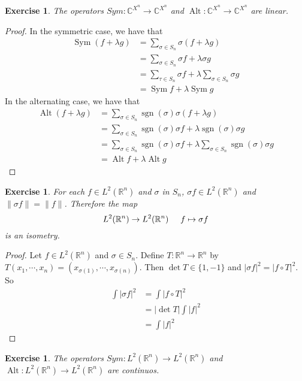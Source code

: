 \documentclass[12pt]{amsart}
\newtheorem{ex}[thm]{Exercise}
\newcommand{\lam}{\lambda}
\newcommand{\sig}{\sigma}
\newcommand{\C}{\mathbb{C}}
\newcommand{\R}{\mathbb{R}}
\DeclareMathOperator{\alt}{Alt}
\DeclareMathOperator{\sym}{Sym}
\DeclareMathOperator{\sgn}{sgn}
\begin{document}
\begin{ex}
	The operators $Sym: \C^{X^n} \rightarrow \C^{X^n}$ and $\alt: \C^{X^n} \rightarrow \C^{X^n}$ are linear.
\end{ex}

\begin{proof} 
	In the symmetric case, we have that
	\begin{align*}
		\sym(f+ \lam g) 
		&= \sum_{\sig \in S_n}  \sig (f+ \lam g) \\
		&= \sum_{\sig \in S_n}  \sig f + \lam \sig g \\
		&= \sum_{\tau \in S_n}  \sig f + \lam \sum_{\sig \in S_n}  \sig g \\
		&= \sym f + \lam \sym g
	\end{align*}
	In the alternating case, we have that
	\begin{align*}
		\alt(f+ \lam g) 
		&= \sum_{\sig \in S_n}  \sgn(\sig) \sig (f+ \lam g) \\
		&= \sum_{\sig \in S_n}  \sgn(\sig) \sig f + \lam \sgn(\sig) \sig g \\
		&= \sum_{\sig \in S_n}  \sgn(\sig) \sig f + \lam  \sum_{\sig \in S_n}  \sgn(\sig) \sig g \\
		&= \alt f + \lam \alt g
	\end{align*}
\end{proof}

\begin{ex}
	For each $f \in L^2(\R^n)$ and $\sig$ in $S_n$, $\sig f \in L^2(\R^n)$ and $\| \sig f \| = \| f \|$. Therefore the map $$L^2(\R^n) \rightarrow L^2(\R^n) \hspace{.5cm} f \mapsto \sig f$$ is an isometry.
\end{ex}

\begin{proof}
	Let $f \in L^2(\R^n)$ and $\sig \in S_n$. Define $T: \R^n \rightarrow \R^n$ by $T(x_1, \cdots, x_n) = (x_{\sig(1)}, \cdots, x_{\sig(n)})$. Then $\det T \in \{1, -1\}$ and $ |\sig f|^2 = |f \circ T|^2$. So 
	\begin{align*}
		\int |\sig f|^2 
		&= \int |f \circ T|^2 \\
		&= |\det T| \int |f|^2 \\
		&=  \int |f|^2
	\end{align*}
\end{proof}

\begin{ex}
	The operators $Sym: L^2(\R^n) \rightarrow L^2(\R^n)$ and $\alt: L^2(\R^n) \rightarrow L^2(\R^n)$ are continuos.
\end{ex}
\end{document}
